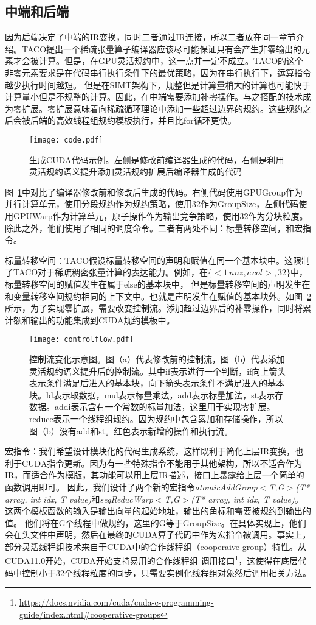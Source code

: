 \subsection{中端和后端}
因为后端决定了中端的IR变换，同时二者通过IR连接，所以二者放在同一章节介绍。TACO提出一个稀疏张量算子编译器应该尽可能保证只有会产生非零输出的元素才会被计算。但是，在GPU灵活规约中，这一点并一定不成立。TACO的这个非零元素要求是在代码串行执行条件下的最优策略，因为在串行执行下，运算指令越少执行时间越短。
但是在SIMT架构下，规整但是计算量稍大的计算也可能快于计算量小但是不规整的计算。因此，在中端需要添加补零操作。与之搭配的技术成为零扩展。零扩展意味着向稀疏循环理论中添加一些超过边界的规约。这些规约之后会被后端的高效线程组规约模板执行，并且比for循环更快。
\begin{figure}[h]%
  \centering
  \texttt{[image: code.pdf]}
  \caption{生成CUDA代码示例。左侧是修改前编译器生成的代码，右侧是利用灵活规约语义提升添加灵活规约扩展后编译器生成的代码}\label{fig:code-example}
\end{figure}
图~\ref{fig:code-example}中对比了编译器修改前和修改后生成的代码。右侧代码使用GPUGroup作为并行计算单元，使用分段规约作为规约策略，使用32作为GroupSize，左侧代码使用GPUWarp作为计算单元，原子操作作为输出竞争策略，使用32作为分块粒度。除此之外，他们使用了相同的调度命令。二者有两处不同：标量转移空间，和宏指令。

标量转移空间：TACO假设标量转移空间的声明和赋值在同一个基本块中\cite{kjolstad:2019:workspaces}。这限制了TACO对于稀疏稠密张量计算的表达能力。例如，在$\{<1\,nnz , c\,col>,32\}$中，标量转移空间的赋值发生在属于else的基本块中，
但是标量转移空间的声明发生在和变量转移空间规约相同的上下文中。也就是声明发生在赋值的基本块外。如图~\ref{fig:controlflow}所示，为了实现零扩展，需要改变控制流。添加超过边界后的补零操作，同时将累计额和输出的功能集成到CUDA规约模板中。
\begin{figure}[h]%
  \centering
  \texttt{[image: controlflow.pdf]}
  \caption{控制流变化示意图。图（a）代表修改前的控制流，图（b）代表添加灵活规约语义提升后的控制流。其中if表示进行一个判断，if向上箭头表示条件满足后进入的基本块，向下箭头表示条件不满足进入的基本块。ld表示取数据，mul表示标量乘法，add表示标量加法，st表示存数据。addi表示含有一个常数的标量加法，这里用于实现零扩展。reduce表示一个线程组规约。因为规约中包含累加和存储操作，所以图（b）没有add和st。红色表示新增的操作和执行流。}
  \label{fig:controlflow}
\end{figure}
宏指令：我们希望设计模块化的代码生成系统，这样既利于简化上层IR变换，也利于CUDA指令更新。因为有一些特殊指令不能用于其他架构，所以不适合作为IR，而适合作为模版，其功能可以用上层IR描述，接口上暴露给上层一个简单的函数调用即可。
因此，我们设计了两个新的宏指令\textit{atomicAddGroup$<$T,G$>$(T* array, int idx, T value)}和\textit{segReducWarp$<$T,G$>$(T* array, int idx, T value)}。这两个模板函数的输入是输出向量的起始地址，输出的角标和需要被规约到输出的值。
他们将在G个线程中做规约，这里的G等于GroupSize。在具体实现上，他们会在头文件中声明，然后在最终的CUDA算子代码中作为宏指令被调用。事实上，部分灵活线程组技术来自于CUDA中的合作线程组（cooperaive group）特性。从CUDA11.0开始，CUDA开始支持易用的合作线程组
调用接口\footnote{\url{https://docs.nvidia.com/cuda/cuda-c-programming-guide/index.html\#cooperative-groups}}，这使得在底层代码中控制小于32个线程粒度的同步，只需要实例化线程组对象然后调用相关方法。

